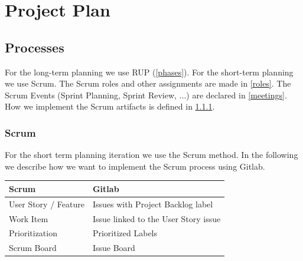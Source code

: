 \chapter{Project Plan}


\section{Processes}
For the long-term planning we use RUP (\ref{phases}).
For the short-term planning we use Scrum.
The Scrum roles and other assignments are made in \ref{roles}.
The Scrum Events (Sprint Planning, Sprint Review, ...) are declared in \ref{meetings}.
How we implement the Scrum artifacts is defined in \ref{scrum}.

\subsection{Scrum}
\label{scrum}
For the short term planning iteration we use the Scrum method.
In the following we describe how we want to implement the Scrum process using Gitlab.

\begin{tabular}{|l|l|}
  \textbf{Scrum} & \textbf{Gitlab} \\
  \hline
  User Story / Feature & Issues with Project Backlog label \\
  Work Item & Issue linked to the User Story issue \\
  Prioritization & Prioritized Labels \\
  Scrum Board & Issue Board \\
\end{tabular}


